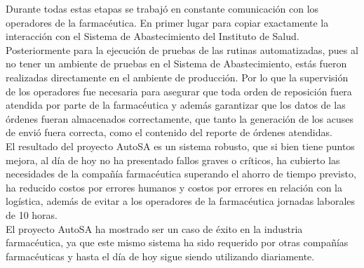 Durante todas estas etapas se trabajó en constante comunicación con los operadores de la farmacéutica. En primer lugar para copiar exactamente la interacción con el Sistema de Abastecimiento del Instituto de Salud. Posteriormente para la ejecución de pruebas de las rutinas automatizadas, pues al no tener un ambiente de pruebas en el Sistema de Abastecimiento, estás fueron realizadas directamente en el ambiente de producción. Por lo que la supervisión de los operadores fue necesaria para asegurar que toda orden de reposición fuera atendida por parte de la farmacéutica y además garantizar que los datos de las órdenes fueran almacenados correctamente, que tanto la generación de los acuses de envió fuera correcta, como el contenido del reporte de órdenes atendidas.\\
El resultado del proyecto AutoSA es un sistema robusto, que si bien tiene puntos mejora, al día de hoy no ha presentado fallos graves o críticos, ha cubierto las necesidades de la compañía farmacéutica superando el ahorro de tiempo previsto, ha reducido costos por errores humanos y costos por errores en relación con la logística, además de evitar a los operadores de la farmacéutica jornadas laborales de 10 horas.\\
El proyecto AutoSA ha mostrado ser un caso de éxito en la industria farmacéutica, ya que este mismo sistema ha sido requerido por otras compañías farmacéuticas y hasta el día de hoy sigue siendo  utilizando diariamente.\\

